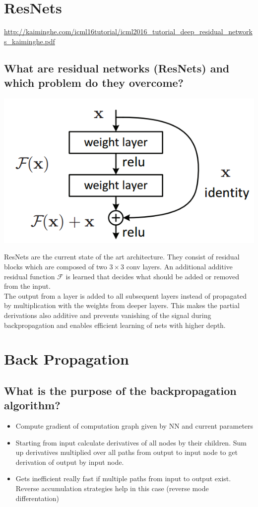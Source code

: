 \section{ResNets}
\url{http://kaiminghe.com/icml16tutorial/icml2016_tutorial_deep_residual_networks_kaiminghe.pdf}
\subsection{What are residual networks (ResNets) and which problem do they overcome?}
\begin{minipage}{0.35\textwidth}
\includegraphics[width=\textwidth]{./img/residual.png}
\end{minipage}
\begin{minipage}{0.65\textwidth}
ResNets are the current state of the art architecture. They consist of residual blocks which are composed of two $3\times 3$ conv layers. An additional additive residual function $\mathcal F$ is learned that decides what should be added or removed from the input. \\


The output from a layer is added to all subsequent layers instead of propagated by multiplication with the weights from deeper layers. This makes the partial derivations also additive and prevents vanishing of the signal during backpropagation and enables efficient learning of nets with higher depth. 
\end{minipage}

%
\section{Back Propagation}
\subsection{What is the purpose of the backpropagation algorithm?}
\begin{itemize}
\item { Compute gradient of computation graph given by NN and current parameters}
\item { Starting from input calculate derivatives of all nodes by their children. Sum up derivatives multiplied over all paths from output to input node to get derivation of output by input node. }
\item { Gets inefficient really fast if multiple paths from input to output exist. Reverse accumulation strategies help in this case (reverse mode differentation)}
\end{itemize}
